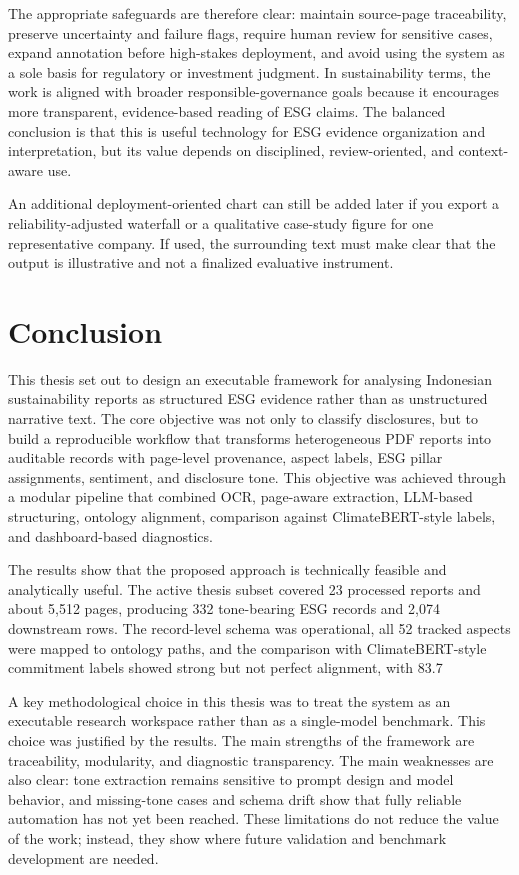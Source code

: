 \documentclass[english, online, cse, master]{dithesis}
\begin{document}
The appropriate safeguards are therefore clear: maintain source-page traceability, preserve uncertainty and failure flags, require human review for sensitive cases, expand annotation before high-stakes deployment, and avoid using the system as a sole basis for regulatory or investment judgment. In sustainability terms, the work is aligned with broader responsible-governance goals because it encourages more transparent, evidence-based reading of ESG claims. The balanced conclusion is that this is useful technology for ESG evidence organization and interpretation, but its value depends on disciplined, review-oriented, and context-aware use.

An additional deployment-oriented chart can still be added later if you export a reliability-adjusted waterfall or a qualitative case-study figure for one representative company. If used, the surrounding text must make clear that the output is illustrative and not a finalized evaluative instrument.
   
\chapter{Conclusion}
  \label{summary}
  This thesis set out to design an executable framework for analysing Indonesian sustainability reports as structured ESG evidence rather than as unstructured narrative text. The core objective was not only to classify disclosures, but to build a reproducible workflow that transforms heterogeneous PDF reports into auditable records with page-level provenance, aspect labels, ESG pillar assignments, sentiment, and disclosure tone. This objective was achieved through a modular pipeline that combined OCR, page-aware extraction, LLM-based structuring, ontology alignment, comparison against ClimateBERT-style labels, and dashboard-based diagnostics.

The results show that the proposed approach is technically feasible and analytically useful. The active thesis subset covered 23 processed reports and about 5,512 pages, producing 332 tone-bearing ESG records and 2,074 downstream rows. The record-level schema was operational, all 52 tracked aspects were mapped to ontology paths, and the comparison with ClimateBERT-style commitment labels showed strong but not perfect alignment, with 83.7

A key methodological choice in this thesis was to treat the system as an executable research workspace rather than as a single-model benchmark. This choice was justified by the results. The main strengths of the framework are traceability, modularity, and diagnostic transparency. The main weaknesses are also clear: tone extraction remains sensitive to prompt design and model behavior, and missing-tone cases and schema drift show that fully reliable automation has not yet been reached. These limitations do not reduce the value of the work; instead, they show where future validation and benchmark development are needed.
\end{document}
